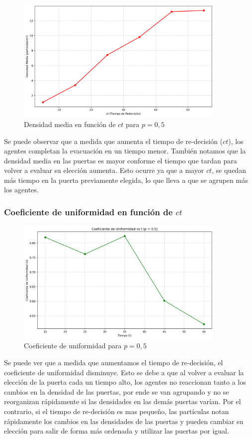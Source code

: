 \documentclass[12pt]{article}
\begin{document}
\begin{figure}[H]
    \centering
    \includegraphics[width=0.9\textwidth]{img/average_density_p0.50.png}
    \caption{Densidad media en función de $ct$ para $p=0,5$}
    \label{fig:flow_p100}
\end{figure}

Se puede observar que a medida que aumenta el tiempo de re-decisión ($ct$), los agentes completan la evacuación en un tiempo menor. También notamos que la densidad media en las puertas es mayor conforme el tiempo que tardan para volver a evaluar su elección aumenta. Esto ocurre ya que a mayor $ct$, se quedan más tiempo en la puerta previamente elegida, lo que lleva a que se agrupen más los agentes.

\subsubsection{Coeficiente de uniformidad en función de $ct$}

\begin{figure}[H]
    \centering
    \includegraphics[width=0.9\textwidth]{img/uniformity_vs_t_p0.5.png}
    \caption{Coeficiente de uniformidad para $p=0,5$}
    \label{fig:flow_p100}
\end{figure}
Se puede ver que a medida que aumentamos el tiempo de re-decisión, el coeficiente de uniformidad disminuye. Esto se debe a que al volver a evaluar la elección de la puerta cada un tiempo alto, los agentes no reaccionan tanto a los cambios en la densidad de las puertas, por ende se van agrupando y no se reorganizan rápidamente si las densidades en las demás puertas varían. Por el contrario, si el tiempo de re-decisión es mas pequeño, las partículas notan rápidamente los cambios en las densidades de las puertas y pueden cambiar su elección para salir de forma más ordenada y utilizar las puertas por igual.
\end{document}
